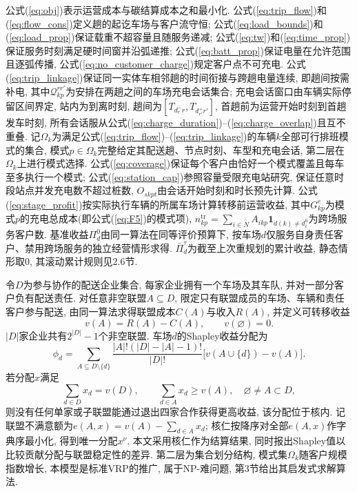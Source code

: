 \documentclass{setp-new}
\begin{document}
公式(\ref{eq:obj})表示运营成本与碳结算成本之和最小化.
公式(\ref{eq:trip_flow})和(\ref{eq:flow_cons})定义趟的起讫车场与客户流守恒;
公式(\ref{eq:load_bounds})和(\ref{eq:load_prop})保证载重不超容量且随服务递减;
公式(\ref{eq:tw})和(\ref{eq:time_prop})保证服务时刻满足硬时间窗并沿弧递推;
公式(\ref{eq:batt_prop})保证电量在允许范围且逐弧传播, 公式(\ref{eq:no_customer_charge})规定客户点不可充电.
公式(\ref{eq:trip_linkage})保证同一实体车相邻趟的时间衔接与跨趟电量连续, 即趟间按需补电,
其中$\mathcal Q_{kp}^{rr'}$为安排在两趟之间的车场充电会话集合;
充电会话窗口由车辆实际停留区间界定, 站内为到离时刻, 趟间为$[T_{d_r^-r},T_{d_{r'}^+r'}]$,
首趟前为运营开始时刻到首趟发车时刻, 所有会话服从公式(\ref{eq:charge_duration})--(\ref{eq:charge_overlap})且互不重叠.
记$\Omega_k$为满足公式(\ref{eq:trip_flow})--(\ref{eq:trip_linkage})的车辆$k$全部可行排班模式的集合,
模式$p\in\Omega_k$完整给定其配送趟、节点时刻、车型和充电会话, 第二层在$\Omega_k$上进行模式选择.
公式(\ref{eq:coverage})保证每个客户由恰好一个模式覆盖且每车至多执行一个模式;
公式(\ref{eq:station_cap})参照容量受限充电站研究\cite{ref:12,ref:13},
保证任意时段站点并发充电数不超过桩数, $O_{skpt}$由会话开始时刻和时长预先计算.
公式(\ref{eq:stage_profit})按实际执行车辆的所属车场计算转移前运营收益,
其中$G_{kp}^{e}$为模式$p$的充电总成本(即公式(\ref{eq:F5})的模式项),
$n_{kp}^{\mathrm{tr}}=\sum_{i\in N}A_{ikp}\mathbf 1_{d(k)\neq d_i^0}$为跨场服务客户数.
基准收益$\Pi_d^0$由同一算法在同等评价预算下,
按车场$d$仅服务自身责任客户、禁用跨场服务的独立经营情形求得.
$\bar\Pi_d^\tau$为截至上次重规划的累计收益, 静态情形取0, 其滚动累计规则见2.6节.

令$D$为参与协作的配送企业集合, 每家企业拥有一个车场及其车队, 并对一部分客户负有配送责任.
对任意非空联盟$A\subseteq D$, 限定只有联盟成员的车场、车辆和责任客户参与配送,
由同一算法求得联盟成本$C(A)$与收入$R(A)$, 并定义可转移收益
\begin{equation}
v(A)=R(A)-C(A),\qquad v(\varnothing)=0.
\label{eq:coalition_profit}
\end{equation}
$|D|$家企业共有$2^{|D|}-1$个非空联盟. 车场$d$的Shapley收益分配为
\begin{equation}
\phi_d=\sum_{A\subseteq D\setminus\{d\}}
\frac{|A|!(|D|-|A|-1)!}{|D|!}
\bigl[v(A\cup\{d\})-v(A)\bigr].
\label{eq:shapley}
\end{equation}
若分配$x$满足
\begin{equation}
\sum_{d\in D}x_d=v(D),\qquad
\sum_{d\in A}x_d\ge v(A),\quad \varnothing\ne A\subset D,
\label{eq:core}
\end{equation}
则没有任何单家或子联盟能通过退出四家合作获得更高收益, 该分配位于核内.
记联盟不满意额为$e(A,x)=v(A)-\sum_{d\in A}x_d$;
核仁按降序对全部$e(A,x)$作字典序最小化, 得到唯一分配$x^{\nu}$.
本文采用核仁作为结算结果, 同时报出Shapley值以比较贡献分配与联盟稳定性的差异.
第二层为集合划分结构, 模式集$\Omega_k$随客户规模指数增长,
本模型是标准VRP的推广, 属于NP-难问题, 第3节给出其启发式求解算法.
\end{document}
